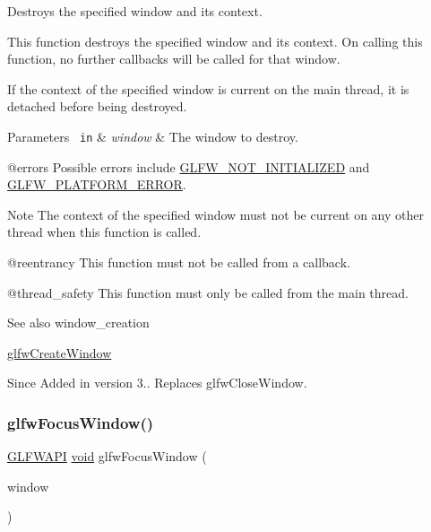 Destroys the specified window and its context. 

This function destroys the specified window and its context. On calling this function, no further callbacks will be called for that window.

If the context of the specified window is current on the main thread, it is detached before being destroyed.


\begin{DoxyParams}[1]{Parameters}
\mbox{\texttt{ in}}  & {\em window} & The window to destroy.\\
\hline
\end{DoxyParams}
@errors Possible errors include \mbox{\hyperlink{group__errors_ga2374ee02c177f12e1fa76ff3ed15e14a}{G\+L\+F\+W\+\_\+\+N\+O\+T\+\_\+\+I\+N\+I\+T\+I\+A\+L\+I\+Z\+ED}} and \mbox{\hyperlink{group__errors_gad44162d78100ea5e87cdd38426b8c7a1}{G\+L\+F\+W\+\_\+\+P\+L\+A\+T\+F\+O\+R\+M\+\_\+\+E\+R\+R\+OR}}.

\begin{DoxyNote}{Note}
The context of the specified window must not be current on any other thread when this function is called.
\end{DoxyNote}
@reentrancy This function must not be called from a callback.

@thread\+\_\+safety This function must only be called from the main thread.

\begin{DoxySeeAlso}{See also}
window\+\_\+creation 

\mbox{\hyperlink{group__window_ga680a02abe0e4494b6759d5703240713e}{glfw\+Create\+Window}}
\end{DoxySeeAlso}
\begin{DoxySince}{Since}
Added in version 3.. Replaces {\ttfamily glfw\+Close\+Window}. 
\end{DoxySince}
\mbox{\label{group__window_ga0da0e3daaa2d100f44a115c09077b510}} 
\subsubsection{\texorpdfstring{glfwFocusWindow()}{glfwFocusWindow()}}
{\footnotesize\ttfamily \mbox{\hyperlink{glfw3_8h_a56da5036b2cc259351ae22fd6439bb47}{G\+L\+F\+W\+A\+PI}} \mbox{\hyperlink{glad_8h_a950fc91edb4504f62f1c577bf4727c29}{void}} glfw\+Focus\+Window (\begin{DoxyParamCaption}\item[{\mbox{\hyperlink{group__window_ga3c96d80d363e67d13a41b5d1821f3242}{G\+L\+F\+Wwindow}} $\ast$}]{window }\end{DoxyParamCaption})}



